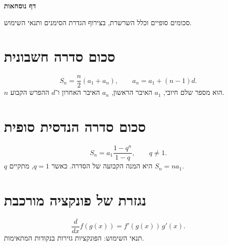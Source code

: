 \def\lakitdocumentclass{article}
\def\lakitclassoptions{11pt,a4paper}
\def\lakitgeometryoptions{margin=1.8cm,headheight=14pt}
\def\lakitlinespread{1.08}
\def\lakitparagraphstyle{block}



{\LARGE\sffamily\bfseries\noindent דף נוסחאות\par}\smallskip
סכומים סופיים וכלל השרשרת, בצירוף הגדרת הסימנים ותנאי השימוש.
\section{סכום סדרה חשבונית}
\[
S_n=\frac{n}{2}(a_1+a_n),\qquad a_n=a_1+(n-1)d.
\]
$n$ הוא מספר שלם חיובי, $a_1$ האיבר הראשון, $a_n$ האיבר האחרון ו־$d$ ההפרש הקבוע.
\section{סכום סדרה הנדסית סופית}
\[
S_n=a_1\frac{1-q^n}{1-q},\qquad q\neq1.
\]
$q$ היא המנה הקבועה של הסדרה. כאשר $q=1$, מתקיים $S_n=n a_1$.
\section{נגזרת של פונקציה מורכבת}
\[
\frac{d}{dx}f(g(x))=f'(g(x))\,g'(x).
\]
תנאי השימוש: הפונקציות גזירות בנקודות המתאימות.

